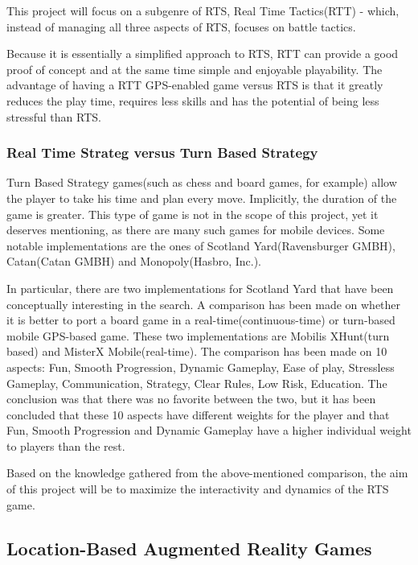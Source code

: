 \documentclass{article}
\begin{document}
This project will focus on a subgenre of RTS, Real Time Tactics(RTT) - which,
instead of managing all three aspects of RTS, focuses on battle tactics.\newline

Because it is essentially a simplified approach to RTS\cite{rttvsrts}, RTT can
provide a good proof of concept and at the same time simple and enjoyable
playability. The advantage of having a RTT GPS-enabled game versus RTS is that
it greatly reduces the play time, requires less skills and has the potential of
being less stressful than RTS.\newline

\subsubsection{Real Time Strateg versus Turn Based Strategy}

Turn Based Strategy games\cite{rtsvstbs}(such as chess and board games, for
example) allow the player to take his time and plan every move. Implicitly, the
duration of the game is greater. This type of game is not in the scope of this
project, yet it deserves mentioning, as there are many such games for mobile
devices. Some notable implementations are the ones of Scotland Yard(Ravensburger
GMBH), Catan(Catan GMBH) and Monopoly(Hasbro, Inc.).\newline

In particular, there are two implementations for Scotland Yard that have been
conceptually interesting in the search. A comparison has been
made\cite{rttvsrts2} on whether it is better to port a board game in a
real-time(continuous-time) or turn-based mobile GPS-based game. These two
implementations are Mobilis XHunt(turn based) and MisterX Mobile(real-time). The
comparison has been made on 10 aspects: Fun, Smooth Progression, Dynamic
Gameplay, Ease of play, Stressless Gameplay, Communication, Strategy, Clear
Rules, Low Risk, Education. The conclusion was that there was no favorite
between the two, but it has been concluded that these 10 aspects have different
weights for the player and that Fun, Smooth Progression and Dynamic Gameplay
have a higher individual weight to players than the rest.\cite[p.5]{rttvsrts2}
\newline

Based on the knowledge gathered from the above-mentioned comparison, the aim of
this project will be to maximize the interactivity and dynamics of the RTS game.


\subsection{Location-Based Augmented Reality Games}
\end{document}
